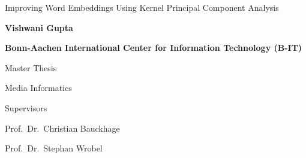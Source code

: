 \documentclass[12pt,a4paper,twoside]{book}
\begin{document}
	
	\raggedbottom
	
	\begingroup
	\begin{titlepage}
		\centering
		\vspace{1.5cm}
		{\huge Improving Word Embeddings Using Kernel Principal Component Analysis\bfseries \par}
		\vspace{2cm}
		{\Large\bfseries Vishwani Gupta\par}
		\vspace{2cm}
		{\bfseries Bonn-Aachen International Center for Information Technology (B-IT)\par}
		\vspace{3cm}
		{\Large Master Thesis\par}
		{\Large Media Informatics\par}
		\vspace{1cm}
		
		\vspace{1cm}
		\vfill
		Supervisors\par
		Prof.~Dr.~Christian Bauckhage\par
		Prof.~Dr.~Stephan Wrobel
		
		\vfill
		
		
	\end{titlepage}
	\newpage
	
	\thispagestyle{empty}
	
	\rule{0cm}{5cm}
	
	
	
	
	\newpage
	\endgroup
	
	\pagestyle{fancy}
	
	\renewcommand{\sectionmark}[1]{\markright{\thesection\ #1}}
	\renewcommand{\chaptermark}[1]{\markboth{\thechapter\ #1}{}}
	\lhead[\rm\thepage]{\sl\rightmark}
	\chead{}
	\rhead[\sl\leftmark]{\rm\thepage}
	
	\lfoot{}
	\cfoot{}
	\rfoot{}
	
	\tableofcontents
	\listoffigures
	\listoftables
	
	\newpage
	
	
	
	
	
	
	
	
	
	
\end{document}
